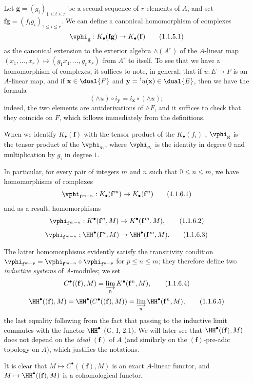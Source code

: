 \begin{env}[1.1.5]
\label{III.1.1.5}
Let $\mathbf{g}=(g_i)_{1\leq i\leq r}$ be a second sequence of $r$ elements of $A$, and set $\mathbf{f}\mathbf{g}=(f_i g_i)_{1\leq i\leq r}$.
We can define a canonical homomorphism of complexes
\[
  \vphi_\mathbf{g}:K_\bullet(\mathbf{f}\mathbf{g})\to K_\bullet(\mathbf{f})
  \tag{1.1.5.1}
\]
as the canonical extension to the exterior algebra $\wedge(A^r)$ of the $A$-linear map $(x_1,\dots,x_r)\mapsto(g_1 x_1,\dots,g_r x_r)$ from $A^r$ to itself.
To see that we have a homomorphism of complexes, it suffices to note, in general, that if $u:E\to F$ is an $A$-linear map, and if $\mathbf{x}\in\dual{F}$ and $\mathbf{y}={}^t u(\mathbf{x})\in\dual{E}$, then we have the formula
\[
  (\wedge u)\circ i_\mathbf{y}=i_\mathbf{x}\circ(\wedge u);
  \tag{1.1.5.2}
\]
indeed, the two elements are antiderivations of $\wedge F$, and it suffices to check that they coincide on $F$, which follows immediately from the definitions.

When we identify $K_\bullet(\mathbf{f})$ with the tensor product of the $K_\bullet(f_i)$ , $\vphi_\mathbf{g}$ is the tensor product of the $\vphi_{g_i}$, where $\vphi_{g_i}$ is the identity in degree $0$ and multiplication by $g_i$ in degree $1$.
\end{env}

\begin{env}[1.1.6]
\label{III.1.1.6}
In particular, for every pair of integers $m$ and $n$ such that $0\leq n\leq m$, we have homomorphisms of complexes
\[
  \vphi_{\mathbf{f}^{m-n}}:K_\bullet(\mathbf{f}^m)\to K_\bullet(\mathbf{f}^n)
  \tag{1.1.6.1}
\]
and as a result, homomorphisms
\[
  \vphi_{\mathbf{f}^{m-n}}:K^\bullet(\mathbf{f}^n,M)\to K^\bullet(\mathbf{f}^m,M),
  \tag{1.1.6.2}
\]
\[
  \vphi_{\mathbf{f}^{m-n}}:\HH^\bullet(\mathbf{f}^n,M)\to\HH^\bullet(\mathbf{f}^m,M).
  \tag{1.1.6.3}
\]

The latter homomorphisms evidently satisfy the transitivity condition $\vphi_{\mathbf{f}^{m-p}}=\vphi_{\mathbf{f}^{m-n}}\circ\vphi_{\mathbf{f}^{n-p}}$ for $p\leq n\leq m$; they therefore define two \emph{inductive systems} of $A$-modules; we set
\[
  C^\bullet((\mathbf{f}),M)=\varinjlim_n K^\bullet(\mathbf{f}^n,M),
  \tag{1.1.6.4}
\]
\[
  \HH^\bullet((\mathbf{f}),M)=\HH^\bullet(C^\bullet((\mathbf{f}),M))=\varinjlim_n\HH^\bullet(\mathbf{f}^n,M),
  \tag{1.1.6.5}
\]
the last equality following from the fact that passing to the inductive limit commutes with the functor $\HH^\bullet$ (G, I, 2.1).
We will later see  that $\HH^\bullet((\mathbf{f}),M)$ does not depend on the \emph{ideal $(\mathbf{f})$} of $A$ (and similarly on the $(\mathbf{f})$-pre-adic topology on $A$), which justifies the notations.

It is clear that $M\mapsto C^\bullet((\mathbf{f}),M)$ is an exact $A$-linear functor, and $M\mapsto\HH^\bullet((\mathbf{f}),M)$ is a cohomological functor.
\end{env}

